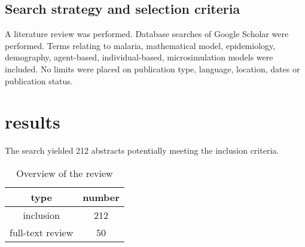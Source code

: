 \documentclass[a4paper, 12pt, twoside]{article}
\begin{document}
\subsection{Search strategy and selection criteria}
A literature review was performed.
Database searches of Google Scholar were performed.
Terms relating to malaria, mathematical model, epidemiology, demography, agent-based, individual-based, microsimulation models were included. No limits were placed on publication type, language, location, dates or publication status. 

\section{results}%
\label{sec:results}
The search yielded 212 abstracts potentially meeting the inclusion criteria. 

\begin{table}
  \centering
  \label{tab:overview_of_the_review}
  \begin{tabular}{c S}
  \toprule
  type & {number} \\
  \midrule
  inclusion & 212 \\
  full-text review & 50 \\
  \bottomrule
  \end{tabular}
  \caption{Overview of the review}
\end{table}

\appendix
\printglossaries
\printnomenclature


\end{document}
